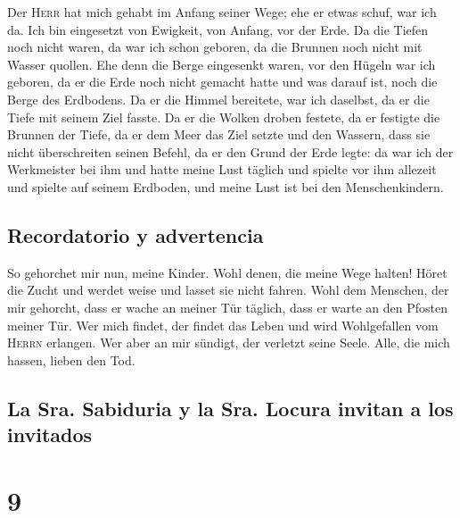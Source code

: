  Der \textsc{Herr} hat mich gehabt im Anfang seiner Wege;
ehe er etwas schuf, war ich da.  Ich bin eingesetzt von
Ewigkeit, von Anfang, vor der Erde.  Da die Tiefen noch
nicht waren, da war ich schon geboren, da die Brunnen noch nicht mit
Wasser quollen.  Ehe denn die Berge eingesenkt waren, vor
den Hügeln war ich geboren,  da er die Erde noch nicht
gemacht hatte und was darauf ist, noch die Berge des Erdbodens.
 Da er die Himmel bereitete, war ich daselbst, da er die
Tiefe mit seinem Ziel fasste.  Da er die Wolken droben
festete, da er festigte die Brunnen der Tiefe,  da er dem
Meer das Ziel setzte und den Wassern, dass sie nicht überschreiten
seinen Befehl, da er den Grund der Erde legte:  da war
ich der Werkmeister bei ihm und hatte meine Lust täglich und spielte vor
ihm allezeit  und spielte auf seinem Erdboden, und meine
Lust ist bei den Menschenkindern.

\hypertarget{recordatorio-y-advertencia}{%
\subsection{Recordatorio y
advertencia}\label{recordatorio-y-advertencia}}

 So gehorchet mir nun, meine Kinder. Wohl denen, die
meine Wege halten!  Höret die Zucht und werdet weise und
lasset sie nicht fahren.  Wohl dem Menschen, der mir
gehorcht, dass er wache an meiner Tür täglich, dass er warte an den
Pfosten meiner Tür.  Wer mich findet, der findet das
Leben und wird Wohlgefallen vom \textsc{Herrn} erlangen. 
Wer aber an mir sündigt, der verletzt seine Seele. Alle, die mich
hassen, lieben den Tod.

\hypertarget{la-sra.-sabiduria-y-la-sra.-locura-invitan-a-los-invitados}{%
\subsection{La Sra. Sabiduria y la Sra. Locura invitan a los
invitados}\label{la-sra.-sabiduria-y-la-sra.-locura-invitan-a-los-invitados}}

\hypertarget{section-8}{%
\section{9}\label{section-8}}

